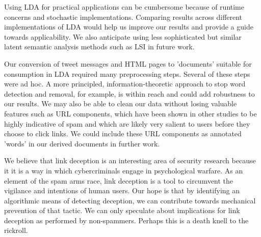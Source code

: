 \documentclass[times, 11pt, twocolumn]{article}
\begin{document}
Using LDA for practical applications can be cumbersome because of runtime concerns and stochastic
implementations.
Comparing results across different implementations of LDA would help us improve our results and
provide a guide towards applicability.
We also anticipate using less sophisticated but similar latent semantic analysis methods such
as LSI in future work.

Our conversion of tweet messages and HTML pages to 'documents' suitable for consumption in LDA
required many preprocessing steps.
Several of these steps were ad hoc.
A more principled, information-theoretic approach to stop word detection and removal,
for example, is within reach and could add robustness to our results.
We may also be able to clean our data without losing valuable features such as URL
components, which have been shown in other studies to be highly indicative of spam
and which are likely very salient to users before they choose to click links.
We could include these URL components as annotated 'words' in our derived documents
in further work.

We believe that link deception is an interesting area of security research because it
it is a way in which cybercriminals engage in psychological warfare.
As an element of the spam arms race, link deception is a tool to circumvent
the vigilance and intentions of human users.
Our hope is that by identifying an algorithmic means of detecting deception,
we can contribute towards mechanical prevention of that tactic.
We can only speculate about implications for link deception as performed
by non-spammers.  Perhaps this is a death knell to the rickroll.



\end{document}
